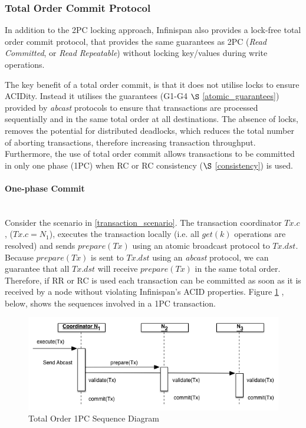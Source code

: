 	    \subsubsection{Total Order Commit Protocol} \label{sec:to_commit}
	    In addition to the 2PC locking approach, Infinispan also provides a lock-free total order commit protocol, that provides the same guarantees as 2PC (\emph{Read Committed}, or \emph{ Read Repeatable}) without locking key/values during write operations.  
	    
	    The key benefit of a total order commit, is that it does not utilise locks to ensure ACIDity.  Instead it utilises the guarantees (G1-G4 $\S$ \ref{atomic_guarantees}) provided by \emph{abcast} protocols to ensure that transactions are processed sequentially and in the same total order at all destinations.  The absence of locks, removes the potential for distributed deadlocks, which reduces the total number of aborting transactions, therefore increasing transaction throughput\citep{Ruivo:2011:ETO:2120967.2121604}.  Furthermore, the use of total order commit allows transactions to be committed in only one phase (1PC) when RC or RC consistency ($\S$ \ref{consistency}) is used.  
	    
	        \paragraph{One-phase Commit} \hspace{0pt} \\
	        Consider the scenario in \ref{transaction_scenario}.  The transaction coordinator $Tx.c$, ($Tx.c = N_1$), executes the transaction locally (i.e. all $get(k)$ operations are resolved) and sends $prepare(Tx)$ using an atomic broadcast protocol to $Tx.dst$.  Because $prepare(Tx)$ is sent to $Tx.dst$ using an \emph{abcast} protocol, we can guarantee that all $Tx.dst$ will receive $prepare(Tx)$ in the same total order.  Therefore, if RR or RC is used each transaction can be committed as soon as it is received by a node without violating Infinispan's ACID properties.  Figure \ref{fig:total_order_1PC} , below, shows the sequences involved in a 1PC transaction.  
	        
            \begin{figure}[htbp!] 
                \centering    
                \includegraphics[width=1.0\textwidth]{1PC-Abcast}
                \caption[Total Order One-phase Commit Protocol]{Total Order 1PC Sequence Diagram}
                \label{fig:total_order_1PC}
            \end{figure}	        
	        
